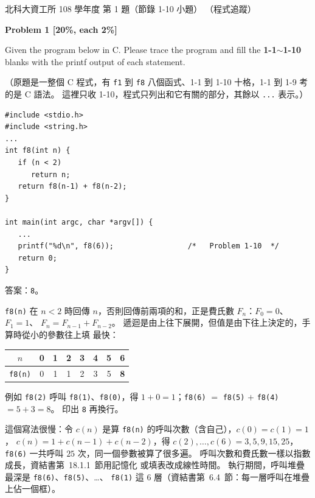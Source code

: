 \begin{pastexam}[label={px:ntut-108-prog-01}]{北科大資工所 108 學年度 第 1 題（節錄 1-10 小題）}
（程式追蹤）

\textbf{Problem 1 [20\%, each 2\%]}

Given the program below in C. Please trace the program and fill the \textbf{1-1$\sim$1-10} blanks
with the printf output of each statement.

（原題是一整個 C 程式，有 \texttt{f1} 到 \texttt{f8} 八個函式、1-1 到 1-10 十格，1-1 到 1-9 考
的是 C 語法。 這裡只收 1-10，程式只列出和它有關的部分，其餘以 \texttt{...} 表示。）
\begin{verbatim}
#include <stdio.h>
#include <string.h>
...
int f8(int n) {
   if (n < 2)
      return n;
   return f8(n-1) + f8(n-2);
}

int main(int argc, char *argv[]) {
   ...
   printf("%d\n", f8(6));                 /*   Problem 1-10  */
   return 0;
}
\end{verbatim}
\end{pastexam}

\begin{pastsoln}
答案：\texttt{8}。

\texttt{f8(n)} 在 $n < 2$ 時回傳 $n$，否則回傳前兩項的和，正是費氏數 $F_n$：$F_0 = 0$、$F_1 = 1$、
$F_n = F_{n-1} + F_{n-2}$。 遞迴是由上往下展開，但值是由下往上決定的，手算時從小的參數往上填
最快：
\begin{center}
\begin{tabular}{c|ccccccc}
$n$ & 0 & 1 & 2 & 3 & 4 & 5 & 6 \\ \hline
\texttt{f8(n)} & 0 & 1 & 1 & 2 & 3 & 5 & \textbf{8} \\
\end{tabular}
\end{center}
例如 \texttt{f8(2)} 呼叫 \texttt{f8(1)}、\texttt{f8(0)}，得 $1 + 0 = 1$；\texttt{f8(6)} $=$
\texttt{f8(5)} $+$ \texttt{f8(4)} $= 5 + 3 = 8$。 印出 \texttt{8} 再換行。

這個寫法很慢：令 $c(n)$ 是算 \texttt{f8(n)} 的呼叫次數（含自己），$c(0) = c(1) = 1$，
$c(n) = 1 + c(n-1) + c(n-2)$，得 $c(2), \ldots, c(6) = 3, 5, 9, 15, 25$，\texttt{f8(6)} 一共呼叫
$25$ 次，同一個參數被算了很多遍。 呼叫次數和費氏數一樣以指數成長，資結書第~18.1.1~節用記憶化
或填表改成線性時間。 執行期間，呼叫堆疊最深是 \texttt{f8(6)}、\texttt{f8(5)}、\ldots、
\texttt{f8(1)} 這 $6$ 層（資結書第~6.4~節：每一層呼叫在堆疊上佔一個框）。
\end{pastsoln}
